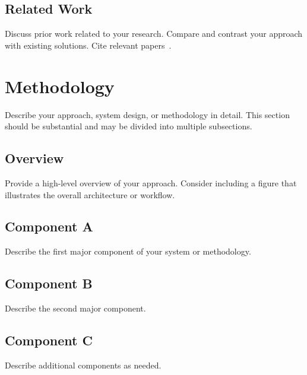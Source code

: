 \documentclass[10pt,conference]{IEEEtran}
\begin{document}
\subsection{Related Work}
Discuss prior work related to your research. Compare and contrast your approach with existing solutions. Cite relevant papers~\cite{example1, example2}.

\section{Methodology}
\label{sec:methodology}

Describe your approach, system design, or methodology in detail. This section should be substantial and may be divided into multiple subsections.

\subsection{Overview}
Provide a high-level overview of your approach. Consider including a figure that illustrates the overall architecture or workflow.


\subsection{Component A}
Describe the first major component of your system or methodology.

\subsection{Component B}
Describe the second major component.

\subsection{Component C}
Describe additional components as needed.

\end{document}

